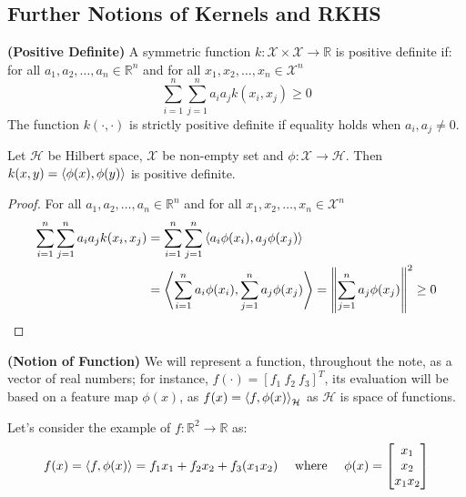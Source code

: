 \subsection{Further Notions of Kernels and RKHS}

\begin{definition}{\textbf{(Positive Definite)}}
    A symmetric function $k:\mathcal{X}\times\mathcal{X}\rightarrow \mathbb{R}$ is positive definite if: for all $a_1,a_2,\dots,a_n\in \mathbb{R}^n$ and for all $x_1,x_2,\dots,x_n\in\mathcal{X}^n$
    \begin{equation*}
        \sum^n_{i=1}\sum^n_{j=1}a_ia_jk(x_i, x_j)\ge0
    \end{equation*}
    The function $k(\cdot,\cdot)$ is strictly positive definite if equality holds when $a_i,a_j\ne0$.
\end{definition}

\begin{theorem}
    Let $\mathcal{H}$ be Hilbert space, $\mathcal{X}$ be non-empty set and $\phi:\mathcal{X}\rightarrow\mathcal{H}$. Then $k(x, y) = \left\langle \phi(x), \phi(y) \right\rangle$ is positive definite. 
\end{theorem}
\begin{proof}
    For all $a_1,a_2,\dots,a_n\in \mathbb{R}^n$ and for all $x_1,x_2,\dots,x_n\in\mathcal{X}^n$
    \begin{equation*}
    \begin{aligned}
        \sum^n_{i=1}\sum^n_{j=1}a_ia_jk(x_i, x_j) &= \sum^n_{i=1}\sum^n_{j=1}\left\langle a_i\phi(x_i), a_j\phi(x_j) \right\rangle \\
        &= \left\langle \sum^n_{i=1}a_i\phi(x_i), \sum^n_{j=1}a_j\phi(x_j) \right\rangle = \left\lVert\sum^n_{j=1}a_j\phi(x_j)\right\rVert^2\ge0
    \end{aligned}
    \end{equation*}
\end{proof}

\begin{definition}{\textbf{(Notion of Function)}}
    \label{def:function-dot}
    We will represent a function, throughout the note, as a vector of real numbers; for instance, $f(\cdot) = [f_1 \ f_2 \ f_3]^T$, its evaluation will be based on a feature map $\phi(x)$, as $f(x) = \left\langle f, \phi(x) \right\rangle_\mathcal{H}$ as $\mathcal{H}$ is space of functions. 
\end{definition}

\begin{remark}
    Let's consider the example of $f:\mathbb{R}^2\rightarrow \mathbb{R}$ as:
    \begin{equation*}
        f(x) = \left\langle f, \phi(x) \right\rangle = f_1x_1 + f_2x_2 + f_3(x_1x_2) \quad \text{ where } \quad \phi(x) = \begin{bmatrix}
            x_1\\x_2\\x_1x_2
        \end{bmatrix}
    \end{equation*}
\end{remark}

